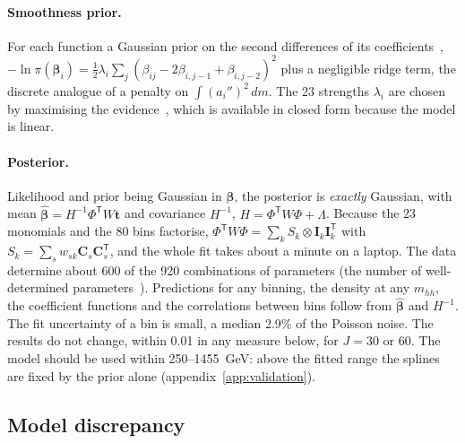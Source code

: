 \paragraph{Smoothness prior.} For each function a Gaussian prior on the second differences of its
coefficients~\cite{Eilers:1996},
$-\ln\pi(\boldsymbol\beta_i) = \tfrac12\lambda_i\sum_j(\beta_{ij} - 2\beta_{i,j-1} + \beta_{i,j-2})^2$
plus a negligible ridge term, the discrete analogue of a penalty on $\int (a_i'')^2\,dm$. The 23
strengths $\lambda_i$ are chosen by maximising the evidence~\cite{MacKay:1992}, which is available in
closed form because the model is linear.

\paragraph{Posterior.} Likelihood and prior being Gaussian in $\boldsymbol\beta$, the posterior is
\emph{exactly} Gaussian, with mean $\hat{\boldsymbol\beta} = H^{-1}\Phi^{\mathsf T}W\boldsymbol t$
and covariance $H^{-1}$, $H = \Phi^{\mathsf T}W\Phi + \Lambda$. Because the 23 monomials and the 80
bins factorise, $\Phi^{\mathsf T}W\Phi = \sum_k S_k\otimes \boldsymbol I_k\boldsymbol I_k^{\mathsf T}$ with
$S_k = \sum_s w_{sk}\boldsymbol C_s\boldsymbol C_s^{\mathsf T}$, and the whole fit takes about a minute
on a laptop. The data determine about 600 of the 920 combinations of parameters (the number of
well-determined parameters~\cite{MacKay:1992}). Predictions for any binning, the density at any
$m_{hh}$, the coefficient functions and the correlations between bins follow from
$\hat{\boldsymbol\beta}$ and $H^{-1}$. The fit uncertainty of a bin is small, a median 2.9\% of the
Poisson noise. The results do not change, within 0.01 in any measure below, for $J = 30$ or 60.
The model should be used within 250--1455~GeV: above the fitted range the splines are fixed by the
prior alone (appendix~\ref{app:validation}).

\subsection{Model discrepancy}
\label{app:disc}

